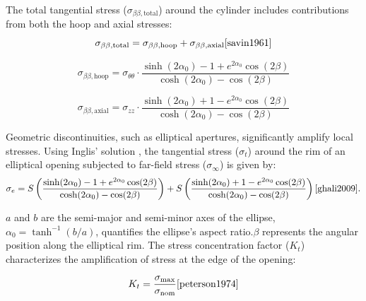 \documentclass[a4paper,11pt]{article}
\begin{document}
The total tangential stress (\(\sigma_{\beta\beta, \text{total}}\)) around the cylinder includes contributions from both the hoop and axial stresses:
\begin{equation}
\sigma_{\beta\beta, \text{total}} = \sigma_{\beta\beta, \text{hoop}} + \sigma_{\beta\beta, \text{axial}}\cite{savin1961}
\end{equation}


 \vspace{-15pt}
\begin{minipage}{0.45\textwidth}
\begin{equation}
\sigma_{\beta\beta, \text{hoop}} = \sigma_{\theta\theta} \cdot \frac{\sinh(2\alpha_0) - 1 + e^{2\alpha_0} \cos(2\beta)}{\cosh(2\alpha_0) - \cos(2\beta)}
\end{equation}
\vspace{-15pt}
\end{minipage}%
\hfill
\begin{minipage}{0.45\textwidth}
\begin{equation}
\sigma_{\beta\beta, \text{axial}} = \sigma_{zz} \cdot \frac{\sinh(2\alpha_0) + 1 - e^{2\alpha_0} \cos(2\beta)}{\cosh(2\alpha_0) - \cos(2\beta)}
\end{equation}
\vspace{-15pt}
\end{minipage}

 


 

Geometric discontinuities, such as elliptical apertures, significantly amplify local stresses. Using Inglis’ solution \cite{inglis1913}, the tangential stress (\(\sigma_t\)) around the rim of an elliptical opening subjected to far-field stress (\(\sigma_\infty\)) is given by:
\begin{equation}
\sigma_e = S \left( \frac{\sinh(2\alpha_0) - 1 + e^{2\alpha_0} \cos(2\beta)}{\cosh(2\alpha_0) - \cos(2\beta)} \right) 
+ S \left( \frac{\sinh(2\alpha_0) + 1 - e^{2\alpha_0} \cos(2\beta)}{\cosh(2\alpha_0) - \cos(2\beta)} \right) \cite{ghali2009}.
\label{eq:tangential_stress}
\end{equation}

 \(a\) and \(b\) are the semi-major and semi-minor axes of the ellipse, \(\alpha_0 = \tanh^{-1}(b/a)\), quantifies the ellipse’s aspect ratio.\(\beta\) represents the angular position along the elliptical rim. The stress concentration factor (\(K_t\)) characterizes the amplification of stress at the edge of the opening:
  
\begin{equation}
K_t = \frac{\sigma_{\text{max}}}{\sigma_{\text{nom}}}\cite{peterson1974}
\label{eq:stress concentration factor}
\end{equation}
 \vspace{-10pt}
\end{document}
